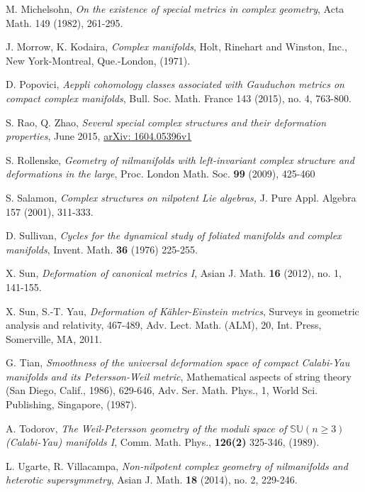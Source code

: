 \documentclass[12pt]{amsart}
\numberwithin{equation}{section}
\renewcommand{\1}{\mathds{1}}
\renewcommand{\>}{\rightarrow}
\begin{document}
\begin{thebibliography}{99}
 M. Michelsohn,
\newblock \textit{On the existence of special metrics in complex geometry},
\newblock Acta Math. 149 (1982), 261-295.

 J. Morrow, K. Kodaira,
\newblock \textit{Complex manifolds},
\newblock Holt, Rinehart and Winston, Inc.,
New York-Montreal, Que.-London, (1971).

 D. Popovici,
\newblock \textit{Aeppli cohomology classes associated with Gauduchon metrics on compact complex manifolds},
\newblock Bull. Soc. Math. France 143 (2015), no. 4, 763-800.

 S. Rao, Q. Zhao,
\newblock \textit{Several special complex structures and their deformation
properties}, June 2015,
\newblock \href{http://arxiv.org/abs/1604.05396v1}{arXiv: 1604.05396v1}

 S. Rollenske,
\newblock \textit{Geometry of nilmanifolds with left-invariant complex structure and deformations in the large},
\newblock Proc. London Math. Soc. \textbf{99} (2009), 425-460

 S. Salamon,
\newblock \textit{Complex structures on nilpotent Lie algebras,}
\newblock  J. Pure
Appl. Algebra 157 (2001), 311-333.

 D. Sullivan,
\newblock \textit{Cycles for the dynamical study of foliated manifolds and complex
manifolds},
\newblock Invent. Math. \textbf{36} (1976) 225-255.


 X. Sun,
\newblock \textit{Deformation of canonical metrics I},
\newblock Asian J. Math. \textbf{16} (2012), no. 1, 141-155.

 X. Sun, S.-T. Yau,
\newblock \textit{Deformation of K\"ahler-Einstein
metrics},
\newblock Surveys in geometric analysis and relativity,
467-489, Adv. Lect. Math. (ALM), 20, Int. Press, Somerville, MA,
2011.



 G. Tian,
\newblock \textit{Smoothness of the universal deformation space
of compact Calabi-Yau manifolds and its Petersson-Weil metric},
\newblock Mathematical aspects of string theory (San Diego, Calif., 1986),
629-646, Adv. Ser. Math. Phys., 1, World Sci. Publishing, Singapore,
(1987).

 A. Todorov,
\newblock \textit{The Weil-Petersson geometry of the moduli
space of $\mathbb{SU}${$(n\geq3)$} (Calabi-Yau) manifolds I},
\newblock Comm. Math. Phys., \textbf{126(2)} 325-346, (1989).

 L. Ugarte, R. Villacampa,
\newblock \textit{Non-nilpotent complex geometry of nilmanifolds and heterotic supersymmetry},
\newblock Asian J. Math. \textbf{18} (2014), no. 2, 229-246.


\end{thebibliography}
\end{document}
